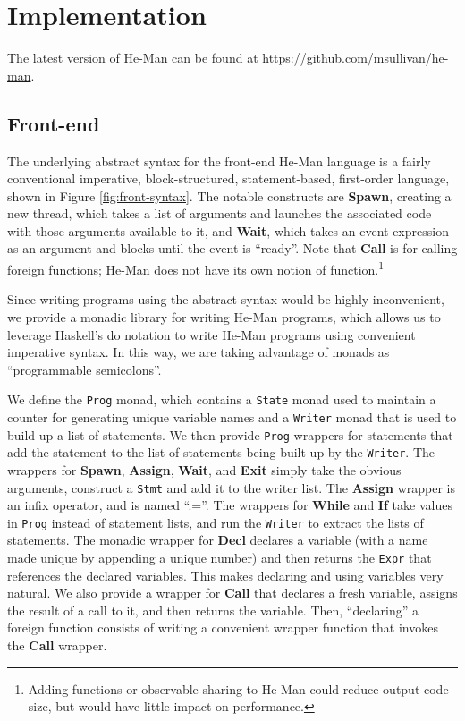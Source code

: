 \documentclass[preprint]{sigplanconf}
\renewcommand{\t}{\texttt}
\renewcommand{\b}{\textbf}
\begin{document}
\section{Implementation}

The latest version of He-Man can be found at
\url{https://github.com/msullivan/he-man}.

\subsection{Front-end}

The underlying abstract syntax for the front-end He-Man language is a
fairly conventional imperative, block-structured, statement-based,
first-order language, shown in Figure \ref{fig:front-syntax}. The
notable constructs are \b{Spawn}, creating a new thread, which takes a
list of arguments and launches the associated code with those
arguments available to it, and \b{Wait}, which takes an event
expression as an argument and blocks until the event is
``ready''. Note that \b{Call} is for calling foreign functions; He-Man
does not have its own notion of function.\footnote{Adding functions or
observable sharing to He-Man could reduce output code size, but would have
little impact on performance.}

Since writing programs using the abstract syntax would be highly
inconvenient, we provide a monadic library for writing He-Man
programs, which allows us to leverage Haskell's do notation to write
He-Man programs using convenient imperative syntax. In this way, we
are taking advantage of monads as ``programmable semicolons''.

We define the \t{Prog} monad, which contains a \t{State} monad used to
maintain a counter for generating unique variable names and a
\t{Writer} monad that is used to build up a list of statements. We
then provide \t{Prog} wrappers for statements that add the statement
to the list of statements being built up by the \t{Writer}. The
wrappers for \b{Spawn}, \b{Assign}, \b{Wait}, and \b{Exit} simply take
the obvious arguments, construct a \t{Stmt} and add it to the writer
list. The \b{Assign} wrapper is an infix operator, and is named
``.=''. The wrappers for \b{While} and \b{If} take values in \t{Prog}
instead of statement lists, and run the \t{Writer} to extract the
lists of statements. The monadic wrapper for \b{Decl} declares a
variable (with a name made unique by appending a unique number) and
then returns the \t{Expr} that references the declared variables. This
makes declaring and using variables very natural. We also provide a
wrapper for \b{Call} that declares a fresh variable, assigns the
result of a call to it, and then returns the variable. Then,
``declaring'' a foreign function consists of writing a convenient
wrapper function that invokes the \b{Call} wrapper.
\end{document}
